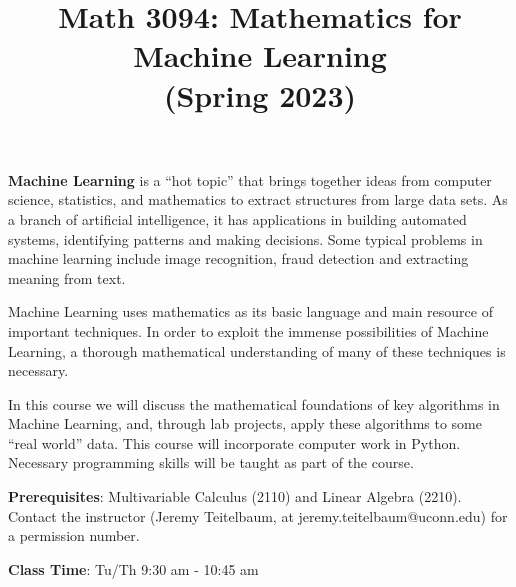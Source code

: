 \documentclass[12pt,letterpaper]{amsart}
\theoremstyle{plain}
\theoremstyle{definition}
\numberwithin{equation}{section}
\begin{document}
\title{Math 3094:  Mathematics for Machine Learning \\(Spring 2023)}

\maketitle

\thispagestyle{empty}

{\bf Machine Learning} is a ``hot topic'' that brings together ideas from computer science, statistics, and mathematics to
extract structures from large data sets. As a branch of artificial intelligence, it has applications in building automated systems, identifying patterns and making decisions. Some typical problems in machine learning include image
recognition, fraud detection and extracting meaning from text.

Machine Learning uses mathematics as its basic language and main resource of important techniques. In order to exploit the immense possibilities of Machine Learning, a thorough  mathematical understanding of many of these techniques is necessary.

In this course we will discuss the mathematical foundations of key algorithms in Machine Learning, and, through lab projects, apply these algorithms to some “real world” data. This course will incorporate computer work in Python. Necessary programming skills will be taught as part of the course.

\bigskip 

{\bf Prerequisites}:  Multivariable Calculus (2110) and Linear Algebra (2210). Contact the instructor (Jeremy Teitelbaum, at jeremy.teitelbaum@uconn.edu) for a permission number.

\bigskip

{\bf Class Time}: Tu/Th 9:30 am - 10:45 am

\bigskip
\end{document}
